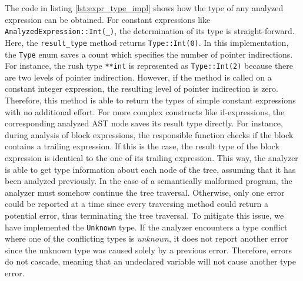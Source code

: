 
The code in listing \ref{lst:expr_type_impl} shows how the type of any analyzed expression can be obtained.
For constant expressions like \verb|AnalyzedExpression::Int(_)|, the determination of its type is straight-forward.
Here, the \texttt{result\_type} method returns \verb|Type::Int(0)|.
In this implementation, the \texttt{Type} enum saves a count which specifies the number of pointer indirections.
For instance, the rush type \texttt{**int} is represented as \verb|Type::Int(2)| because there are two levels of pointer indirection.
However, if the method is called on a constant integer expression, the resulting level of pointer indirection is zero.
Therefore, this method is able to return the types of simple constant expressions with no additional effort.
For more complex constructs like if-expressions,
the corresponding analyzed AST node saves its result type directly.
For instance, during analysis of block expressions,
the responsible function checks if the block contains a trailing expression.
If this is the case, the result type of the block expression is identical to the one of its trailing expression.
This way, the analyzer is able to get type information about each node of the tree, assuming that it has been analyzed previously.
In the case of a semantically malformed program,
the analyzer must somehow continue the tree traversal.
Otherwise, only one error could be reported at a time since every traversing method could return a potential error, thus terminating the tree traversal.
To mitigate this issue, we have implemented the \texttt{Unknown} type.
If the analyzer encounters a type conflict where one of the conflicting types is \emph{unknown},
it does not report another error since the unknown type was caused solely by a previous error.
Therefore, errors do not cascade, meaning that an undeclared variable will not cause another type error.

